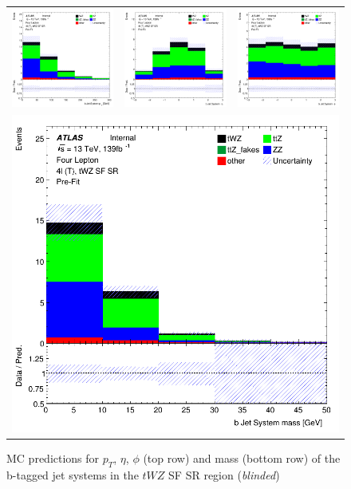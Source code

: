 \begin{figure}[htbp]
\centering
  \begin{tabular}{ccc}

    \includegraphics[width=.2\textwidth]{figures/PreFitPlots/lep4_tWZ_4T_SF_bJet_sys_Pt}&
    \includegraphics[width=.2\textwidth]{figures/PreFitPlots/lep4_tWZ_4T_SF_bJet_sys_Eta} &
    \includegraphics[width=.2\textwidth]{figures/PreFitPlots/lep4_tWZ_4T_SF_bJet_sys_Phi} \\
    \multicolumn{3}{c}{\includegraphics[width=.2\textwidth]{figures/PreFitPlots/lep4_tWZ_4T_SF_bJet_sys_mass}}

  \end{tabular}
  \caption{MC predictions for $p_{T}$, $\eta$, $\phi$ (top row) and mass (bottom row) of the b-tagged jet systems in the $tWZ$ SF SR region (\textit{blinded})}
  \label{fig:4lep-SF-SR-bjet-sys-Plots}
\end{figure}
\clearpage

